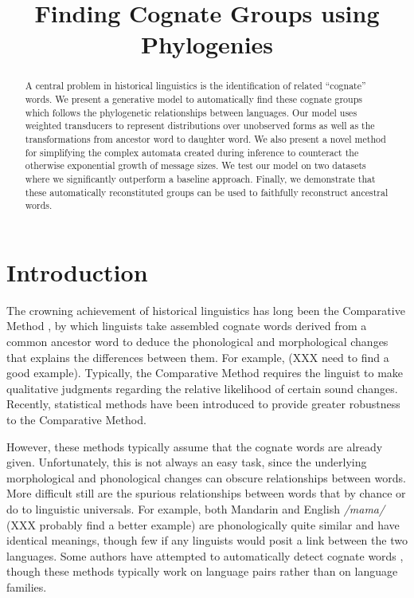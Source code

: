 \documentclass[11pt,a4paper]{article}
\title{Finding Cognate Groups using Phylogenies}
\author{}
\date{}
\begin{document}
\maketitle
\begin{abstract}
  A central problem in historical linguistics is the identification
  of related ``cognate'' words. We present a generative model to
  automatically find these cognate groups which follows the
  phylogenetic relationships between languages. Our model uses
  weighted transducers to represent distributions over unobserved
  forms as well as the transformations from ancestor word to daughter
  word. We also present a novel method for simplifying the complex
  automata created during inference to counteract the otherwise
  exponential growth of message sizes. We test our model on two
  datasets where we significantly outperform a baseline approach.
  Finally, we demonstrate that these automatically reconstituted
  groups can be used to faithfully reconstruct ancestral words.
\end{abstract}
\section{Introduction}

The crowning achievement of historical linguistics has long been
the Comparative Method \cite{ohala93phonetics}, by which linguists
take assembled cognate words derived from a common ancestor word
to deduce the phonological and morphological changes that explains
the differences between them. For example, (XXX need to find a good
example). Typically, the Comparative Method requires the linguist
to make qualitative judgments regarding the relative likelihood of
certain sound changes. Recently, statistical methods have been introduced to provide
greater robustness to the Comparative Method.
\cite{oakes00computer,bouchard07probabilistic,bouchard09improved}

 However, these methods typically assume that the cognate words are already
given. Unfortunately, this is not always an easy task, since the
underlying morphological and phonological changes can obscure
relationships between words. More difficult still are the spurious
relationships between words that by chance or do to linguistic
universals. For example, both Mandarin and English \textit{/mama/}
(XXX probably find a better example) are phonologically quite similar
and have identical meanings, though few if any linguists would posit
a link between the two languages. Some authors have attempted to
automatically detect cognate words
\cite{lowe94reconstruction,oakes00computer,Kondrak01identifyingcognates,mulloni07automatic},
though these methods typically work on language pairs rather than on language
families.
\end{document}
